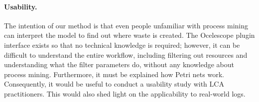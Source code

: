 \paragraph{Usability.}
The intention of our method is that even people unfamiliar with process mining can interpret the model to find out where waste is created.
The Ocelescope plugin interface exists so that no technical knowledge is required; however, it can be difficult to understand the entire workflow, including filtering out resources and understanding what the filter parameters do, without any knowledge about process mining.
Furthermore, it must be explained how Petri nets work.
Consequently, it would be useful to conduct a usability study with LCA practitioners.
This would also shed light on the applicability to real-world logs.


